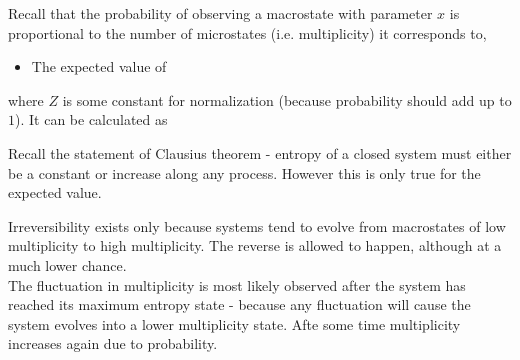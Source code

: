 \documentclass[class=article, crop=false, 12pt]{standalone}
\begin{document}
Recall that the probability of observing a macrostate with parameter $x$ 
is proportional to the number of microstates (i.e. multiplicity) it corresponds to,
\begin{itemize}
    \item The expected value of 
\end{itemize}


where $Z$ is some constant for normalization (because probability should add up to $1$).
It can be calculated as



\begin{notation}
    Recall the statement of Clausius theorem - 
    entropy of a closed system must either be a constant 
    or increase along any process.
    However this is only true for the expected value. 

    Irreversibility exists only because systems tend to evolve from 
    macrostates of low multiplicity to high multiplicity.
    The reverse is allowed to happen,
    although at a much lower chance.\\

    The fluctuation in multiplicity is most likely observed after the system has reached its maximum entropy state - 
    because any fluctuation will cause the system evolves into a lower multiplicity state.
    Afte some time  multiplicity increases again due to probability.
\end{notation}
\end{document}
